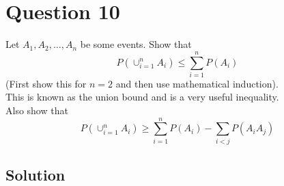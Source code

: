 \section*{Question 10}

Let \(A_{1}, A_{2}, \dots, A_{n}\) be some events.
Show that
\[
    P\left(\cup_{i=1}^{n} A_{i}\right) \leq \sum_{i=1}^{n} P\left(A_{i}\right)
\]
(First show this for \(n=2\) and then use mathematical induction).\\
This is known as the union bound and is a very useful inequality.\\
Also show that
\[
    P\left(\cup_{i=1}^{n} A_{i}\right) \geq \sum_{i=1}^{n} P\left(A_{i}\right)-\sum_{i<j} P\left(A_{i} A_{j}\right)
\]

\subsection*{Solution}
